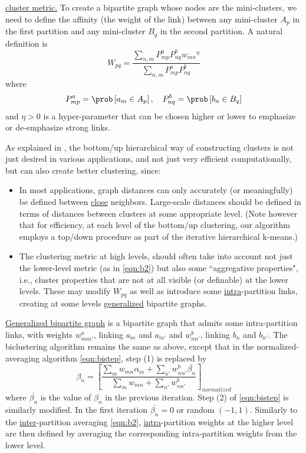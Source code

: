 \documentclass{article} %
\begin{document}
\underline{cluster metric.} To create a bipartite graph whose nodes are the mini-clusters, we need to define  the affinity (the weight of the link) between any mini-cluster $A_p$ in the first partition and any mini-cluster $B_q$ in the second partition. A natural definition is
\begin{equation}
W_{pq} = \frac{\sum_{n,m} P^a_{mp}P^b_{nq}{w_{mn}}^\eta}{ \sum_{n,m}P^a_{mp}P^b_{nq}}
\label{eqn:b2}
\end{equation}
where
\begin{equation}
P^a_{mp} = \prob \left[a_m \in A_p\right], \quad P^b_{nq} = \prob \left[ b_n \in B_q \right]
\end{equation}
and $\eta>0$ is a hyper-parameter that can be chosen higher or lower to emphasize or de-emphasize strong links.

As explained in \cite{RSB}, the bottom/up hierarchical way of constructing clusters is not just desired in various applications, and not just very efficient computationally, but can also create better clustering, since:

\begin{itemize}
\item
In most applications, graph distances can only accurately (or meaningfully) be defined between \underline{close} neighbors. Large-scale distances should be defined in terms of distances between clusters at some appropriate level. (Note however that for efficiency, at each level of the bottom/up clustering, our algorithm employs a top/down procedure as part of the iterative hierarchical k-means.)
\item
The clustering metric at high levels, should often take into account not just the lower-level metric (as in \eqref{eqn:b2}) but also some ``aggregative properties", i.e., cluster properties that are not at all visible (or definable) at the lower levels. These may modify $W_{pq}$ as well as introduce some \underline{intra}-partition links, creating at some levels \underline{generalized} bipartite graphs.
\end{itemize}

\underline{Generalized bipartite graph} is a bipartite graph that admits some intra-partition links, with weights $w^a_{mm'}$, linking $a_m$ and $a_{m'}$ and $w^b_{nn'}$, linking $b_n$ and $b_{n'}$. The biclustering algorithm remains the same as above, except that in the normalized-averaging algorithm \eqref{eqn:bistep}, step (1) is replaced by
\begin{equation}
\beta_n = \left[ \frac{\sum_m w_{mn} \alpha_m + \sum_{n'} w_{nn'}^b \bar{\beta_n}}
{\sum_m w_{mn} + \sum_{n'} w_{nn'}^b} \right]_{normalized} 
\end{equation}
where $\bar{\beta_n}$ is the value of $\beta_n$ in the previous iteration. Step (2) of \eqref{eqn:bistep} is similarly modified. In the first iteration $\bar{\beta_n}=0$ or random $(-1,1)$. Similarly to the 
\underline{inter}-partition averaging \eqref{eqn:b2}, \underline{intra}-partition weights at the higher level are then defined by averaging the corresponding intra-partition weights from the lower level.
\end{document}
